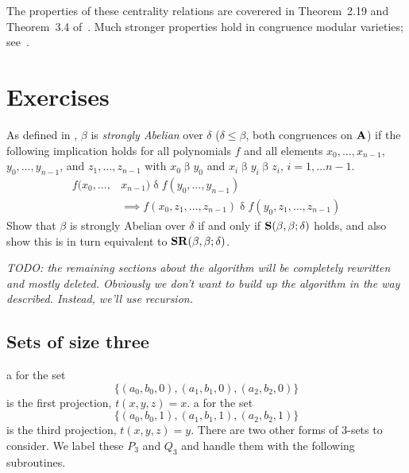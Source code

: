 The properties of these centrality relations are coverered in
Theorem~2.19 and Theorem~3.4 of~\cite{KearnesKiss2013}. Much stronger
properties hold in congruence modular varieties;
see~\cite{FreeseMcKenzie1987}.

\section*{Exercises}

\begin{exercises}

\prob
As defined in \cite{HobbyMcKenzie1988}, $\beta$ is \emph{strongly
Abelian} over $\delta$ ($\delta \leq \beta$, both congruences on $\mathbf{A}$)
if the following implication holds for all polynomials $f$ and all
elements $x_0, \ldots, x_{n-1}$, $y_0, \ldots, y_{n-1}$, and
$z_1, \ldots, z_{n-1}$ with $x_0 \mathrel\beta y_0$ and
$x_i \mathrel\beta y_i \mathrel\beta z_i$, $i = 1, \ldots n-1$.
\begin{align*}
f(x_0,\ldots,&x_{n-1}) \mathrel\delta f(y_0,\ldots,y_{n-1}) \\
&\implies
f(x_0, z_1,\ldots,z_{n-1}) \mathrel\delta f(y_0, z_1,\ldots,z_{n-1})
\end{align*}
Show that $\beta$ is strongly
Abelian over $\delta$ if and only if $\mathbf{S}(\beta,\beta;\delta)$
holds, and also show this is in turn equivalent to
$\mathbf{SR}(\beta,\beta;\delta)$.
\end{exercises}




\noindent \emph{TODO: the remaining sections about the algorithm will be completely
rewritten and mostly deleted.  Obviously we don't want to build up the
algorithm in the way described.  Instead, we'll use recursion.}

\subsection{Sets of size three}
a \ldto for the set
\begin{equation*}
\{(a_0,b_0, 0), (a_1, b_1, 0), (a_2, b_2, 0)\}
\end{equation*}
is the first projection, $t(x,y,z) = x$.
a \ldto for the set
\begin{equation*}
\{(a_0,b_0,1), (a_1, b_1, 1), (a_2, b_2, 1)\}
\end{equation*}
is the third projection, $t(x,y,z) = y$.
There are two other forms of 3-sets to consider.
We label these $P_3$ and $Q_3$ and handle them with
the following subroutines.



